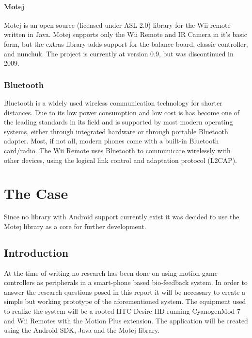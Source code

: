 \documentclass[11pt,twoside,a4paper]{report}
\begin{document}
\subsubsection{Motej}
Motej is an open source (licensed under ASL 2.0) library for the Wii remote written in Java. Motej supports only the Wii Remote and IR Camera in it's basic form, but the extras library adds support for the balance board, classic controller, and nunchuk. The project is currently at version 0.9, but was discontinued in 2009. \cite{Motej}

\subsection{Bluetooth}
Bluetooth is a widely used wireless communication technology for shorter distances. Due to its low power consumption and low cost is has become one of the leading standards in its field and is supported by most modern operating systems, either through integrated hardware or through portable Bluetooth adapter. Most, if not all, modern phones come with a built-in Bluetooth card/radio. %
The Wii Remote uses Bluetooth to communicate wirelessly with other devices, using the logical link control and adaptation protocol (L2CAP). 


\chapter{The Case}
Since no library with Android support currently exist it was decided to use the Motej library as a core for further development.

\section{Introduction}
At the time of writing no research has been done on using motion game controllers as peripherals in a smart-phone based bio-feedback system. In order to answer the research questions posed in this report it will be necessary to create a simple but working prototype of the aforementioned system. The equipment used to realize the system will be a rooted HTC Desire HD \cite{desireHdSpecs} running CyanogenMod 7 \cite{cyanogenMod} and Wii Remotes with the Motion Plus extension. The application will be created using the Android SDK, Java and the Motej library.

\end{document}
